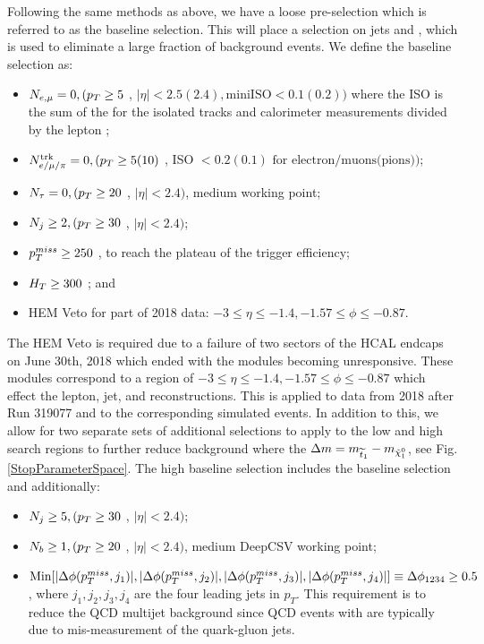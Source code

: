 Following the same methods as above, we have a loose pre-selection which is referred to as the baseline selection. This will place a selection on jets and \met, which is used to eliminate a large fraction of background events. We define the baseline selection as:
\begin{itemize}
	\item $N_{e,\mu} = 0, (p_{T}\geq5$ \GeV, $|\eta|<2.5(2.4), \text{miniISO}<0.1(0.2))$ where the ISO is the sum of the \pt{} for the isolated tracks and calorimeter measurements divided by the lepton \pt;
	\item $N_{e/\mu/\pi}^{\text{trk}} = 0, (p_{T}\geq5 (10)$ \GeV, ISO $< 0.2(0.1) \text{ for electron/muons(pions)})$;
	\item $N_\tau = 0, (p_{T}\geq20$ \GeV, $|\eta|<2.4)$, medium working point;
	\item $N_{j} \geq 2, (p_{T}\geq30$ \GeV, $|\eta|<2.4)$;
	\item $p_{T}^{miss}\geq250$ \GeV, to reach the plateau of the trigger efficiency;
	\item $H_{T}\geq300$ \GeV; and
	\item HEM Veto for part of 2018 data: $-3\leq\eta\leq-1.4, -1.57\leq\phi\leq-0.87$.
\end{itemize}
The HEM Veto is required due to a failure of two sectors of the HCAL endcaps on June 30th, 2018 which ended with the modules becoming unresponsive. These modules correspond to a region of $-3\leq\eta\leq-1.4, -1.57\leq\phi\leq-0.87$ which effect the lepton, jet, and \met{} reconstructions. This is applied to data from 2018 after Run 319077 and to the corresponding simulated events.
In addition to this, we allow for two separate sets of additional selections to apply to the low and high \dm{} search regions to further reduce background where the $\Delta m=m_{\widetilde{t}_1}-m_{\tilde{\chi}^{0}_{1}}$, see Fig. \ref{StopParameterSpace}. The high \dm{} baseline selection includes the baseline selection and additionally:
\begin{itemize}
	\item $N_j\geq 5, (p_{T} \geq30$ \GeV, $|\eta|<2.4)$;
	\item $N_b\geq 1, (p_{T}\geq20$ \GeV, $|\eta|<2.4)$, medium DeepCSV working point;
	\item $\text{Min}[|\Delta\phi(p_{T}^{miss},j_1)|,|\Delta\phi(p_{T}^{miss},j_2)|,|\Delta\phi(p_{T}^{miss},j_3)|,|\Delta\phi(p_{T}^{miss},j_4)|]\equiv\Delta\phi_{1234}\geq0.5$, where $j_1, j_2, j_3, j_4$ are the four leading jets in $p_T$. This requirement is to reduce the QCD multijet background since QCD events with \met{} are typically due to mis-measurement of the quark-gluon jets. 
\end{itemize}
